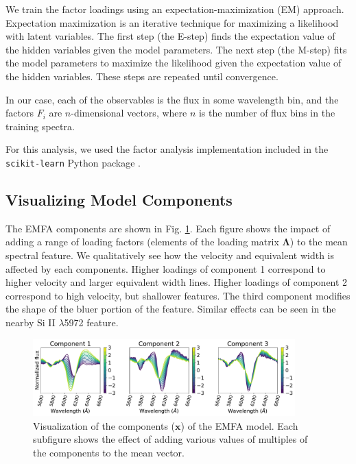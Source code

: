 We train the factor loadings using an expectation-maximization (EM) approach. Expectation maximization is an iterative technique for maximizing a likelihood with latent variables. The first step (the E-step) finds the expectation value of the hidden variables given the model parameters. The next step (the M-step) fits the model parameters to maximize the likelihood given the expectation value of the hidden variables. These steps are repeated until convergence.

In our case, each of the observables is the flux in some wavelength bin, and the factors $F_i$ are $n$-dimensional vectors, where $n$ is the number of flux bins in the training spectra.

For this analysis, we used the factor analysis implementation included in the \verb|scikit-learn| Python package \citep{pedregosa_scikit-learn:_2011}.

\subsection{Visualizing Model Components}
The EMFA components are shown in Fig. \ref{emfa_components}. Each figure shows the impact of adding a range of loading factors (elements of the loading matrix $\bm{\Lambda}$) to the mean spectral feature. We qualitatively see how the velocity and equivalent width is affected by each components. Higher loadings of component 1 correspond to higher velocity and larger equivalent width lines. Higher loadings of component 2 correspond to high velocity, but shallower features. The third component modifies the shape of the bluer portion of the feature. Similar effects can be seen in the nearby Si II $\lambda$5972 feature.

\begin{figure}[!htb]
    \centering
    \includegraphics[width=0.9\textwidth]{figures/si_feat_pca/model_components.pdf}
    \caption{Visualization of the components ($\bm{x}$) of the EMFA model. Each subfigure shows the effect of adding various values of multiples of the components to the mean vector.}
    \label{emfa_components}
\end{figure}

